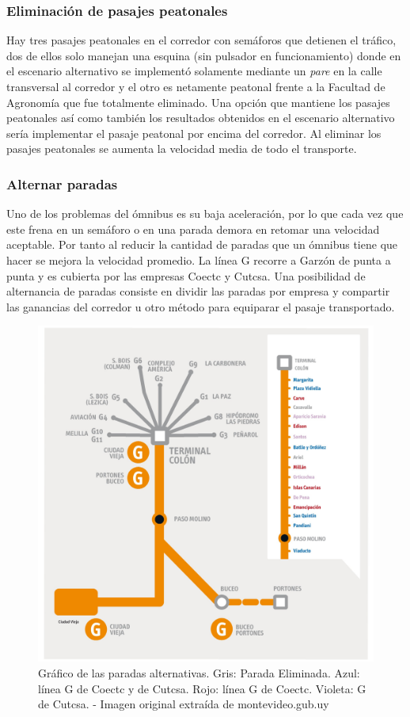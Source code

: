 \subsubsection{Eliminación de pasajes peatonales}
Hay tres pasajes peatonales en el corredor con semáforos que detienen el tráfico, dos de ellos solo manejan una esquina (sin pulsador en funcionamiento) donde en el escenario alternativo se implementó solamente mediante un \emph{pare} en la calle transversal al corredor y el otro es netamente peatonal frente a la Facultad de Agronomía que fue totalmente eliminado. Una opción que mantiene los pasajes peatonales así como también los resultados obtenidos en el escenario alternativo sería implementar el pasaje peatonal por encima del corredor. Al eliminar los pasajes peatonales se aumenta la velocidad media de todo el transporte.

\subsubsection{Alternar paradas}

Uno de los problemas del ómnibus es su baja aceleración, por lo que cada vez que este frena en un semáforo o en una parada demora en retomar una velocidad aceptable. Por tanto al reducir la cantidad de paradas que un ómnibus tiene que hacer se mejora la velocidad promedio.
La línea G recorre a Garzón de punta a punta y es cubierta por las empresas Coectc y Cutcsa. Una posibilidad de alternancia de paradas consiste en dividir las paradas por empresa y compartir las ganancias del corredor u otro método para equiparar el pasaje transportado. 

\begin{figure}[H]
	\centering
	\includegraphics[width=0.9\linewidth]{Figures/paradas_alternativas}
	\caption[Gráfico de las paradas alternativas.]{Gráfico de las paradas alternativas. Gris: Parada Eliminada. Azul: línea G de Coectc y de Cutcsa. Rojo: línea G de Coectc. Violeta: G de Cutcsa. - Imagen original extraída de montevideo.gub.uy}
	\label{fig:paradas_alternadas}
\end{figure}

